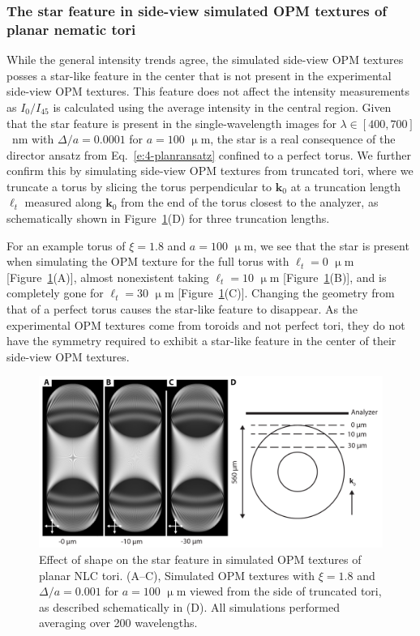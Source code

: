 \subsubsection{The star feature in side-view simulated OPM textures of planar nematic tori}
While the general intensity trends agree, the simulated side-view OPM textures posses a star-like feature in the center that is not present in the experimental side-view OPM textures.
This feature does not affect the intensity measurements as $I_0/I_{45}$ is calculated using the average intensity in the central region.
Given that the star feature is present in the single-wavelength images for $\lambda \in [400,700]$~nm with $\Delta/a = 0.0001$ for $a = 100$ $\upmu$m, the star is a real consequence of the director ansatz from Eq.~\ref{e:4-planransatz} confined to a perfect torus.
We further confirm this by simulating side-view OPM textures from truncated tori, where we truncate a torus by slicing the torus perpendicular to $\mathbf{k}_0$ at a truncation length $\ell_t$ measured along $\mathbf{k}_0$ from the end of the torus closest to the analyzer, as schematically shown in Figure~\ref{f:4-nostar}(D) for three truncation lengths.

For an example torus of $\xi=1.8$ and $a = 100$ $\upmu$m, we see that the star is present when simulating the OPM texture for the full torus with $\ell_t=0$ $\upmu$m [Figure~\ref{f:4-nostar}(A)], almost nonexistent taking $\ell_t=10$ $\upmu$m [Figure~\ref{f:4-nostar}(B)], and is completely gone for $\ell_t=30$ $\upmu$m [Figure~\ref{f:4-nostar}(C)].
Changing the geometry from that of a perfect torus causes the star-like feature to disappear.
As the experimental OPM textures come from toroids and not perfect tori, they do not have the symmetry required to exhibit a star-like feature in the center of their side-view OPM textures.
\begin{figure}
\centering
\includegraphics{figures/C4/Ch4-Figs_SimStarShape.png}
\caption{Effect of shape on the star feature in simulated OPM textures of planar NLC tori.
(A--C), Simulated OPM textures with $\xi = 1.8$ and $\Delta /a = 0.001$ for $a = 100$ $\upmu$m viewed from the side of truncated tori, as described schematically in (D).
All simulations performed averaging over 200 wavelengths.}\label{f:4-nostar}
\end{figure}


